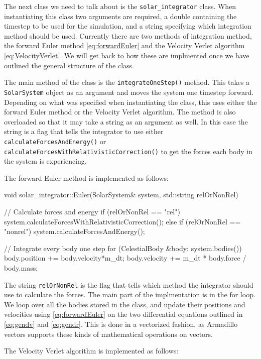 \documentclass[reprint,english,notitlepage]{revtex4-1}  %
\begin{document}
The next class we need to talk about is the \verb+solar_integrator+ class. When instantiating this class two arguments are required, a double containing the timestep to be used for the simulation, and a string specifying which integration method should be used. Currently there are two methods of integration method, the forward Euler method \eqref{eq:forwardEuler} and the Velocity Verlet algorithm \eqref{eq:VelocityVerlet}. We will get back to how these are implmented once we have outlined the general structure of the class. 

The main method of the class is the \verb+integrateOneStep()+ method. This takes a \verb+SolarSystem+ object as an argument and moves the system one timestep forward. Depending on what was specified when instantiating the class, this uses either the forward Euler method or the Velocity Verlet algorithm. The method is also overloaded so that it may take a string as an argument as well. In this case the string is a flag that tells the integrator to use either \verb+calculateForcesAndEnergy()+ or \verb+calculateForcesWithRelativisticCorrection()+ to get the forces each body in the system is experiencing. 

The forward Euler method is implemented as follows:
\begin{cpp}
void solar_integrator::Euler(SolarSystem& system, 
							 std::string relOrNonRel) {
  // Calculate forces and energy
  if (relOrNonRel == "rel") {
    system.calculateForcesWithRelativisticCorrection();
  } else if (relOrNonRel == "nonrel") {
    system.calculateForcesAndEnergy();
  }

  // Integrate every body one step
  for (CelestialBody &body: system.bodies()) {
    body.position += body.velocity*m_dt;
    body.velocity += m_dt * body.force / body.mass;
  }
}
\end{cpp} 

The string \verb+relOrNonRel+ is the flag that tells which method the integrator should use to calculate the forces.    The main part of the implmentation is in the for loop. We loop over all the bodies stored in the class, and update their positions and velocities using \eqref{eq:forwardEuler} on the two differential equations outlined in \eqref{eq:gendv} and \eqref{eq:gendr}. This is done in a vectorized fashion, as Armadillo \citep{Armadillo} vectors supports these kinds of mathematical operations on vectors.

The Velocity Verlet algorithm is implemented as follows:
\end{document}
